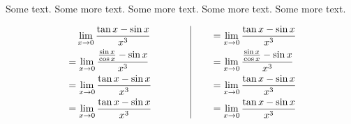 \documentclass[17pt]{extarticle}
\begin{document}
Some text. Some more text. Some more text. Some more text. Some more text.
\begin{fleqn}
\begin{equation}
\begin{alignedat}{4}
& \texttt{\ \ } \lim_{x \to 0} \frac{\tan{x} - \sin{x}}{x^3}\\
&= \lim_{x \to 0} \frac{\frac{\sin{x}}{\cos{x}}-\sin{x}}{x^3}\\
&= \lim_{x \to 0} \frac{\tan{x} - \sin{x}}{x^3}\\
&= \lim_{x \to 0} \frac{\tan{x} - \sin{x}}{x^3}\\
\end{alignedat}
\qquad
\qquad
\vrule
\qquad
\begin{alignedat}{4}
&= \lim_{x \to 0} \frac{\tan{x} - \sin{x}}{x^3}\\
&= \lim_{x \to 0} \frac{\frac{\sin{x}}{\cos{x}}-\sin{x}}{x^3}\\
&= \lim_{x \to 0} \frac{\tan{x} - \sin{x}}{x^3}\\
&= \lim_{x \to 0} \frac{\tan{x} - \sin{x}}{x^3}\\
\end{alignedat}
\end{equation}
\end{fleqn}
\end{document}
